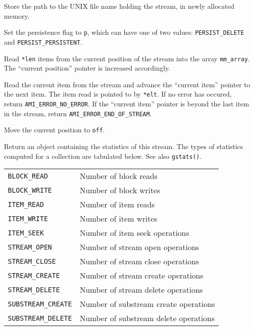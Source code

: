    {Store the path
  to the UNIX file name holding the stream, in newly allocated
  memory.}

   {Set the persistence flag
  to \lstinline|p|, which can have one of two values:
  \lstinline|PERSIST_DELETE| and \lstinline|PERSIST_PERSISTENT|.}
  
  {Read
  \lstinline|*len| items from the current position of the stream into
  the array \lstinline|mm_array|. The ``current position'' pointer is
  increased accordingly.  }  

  {Read the current item from the
  stream and advance the ``current item'' pointer to the next item.
  The item read is pointed to by \lstinline|*elt|. If no error has
  occured, return \lstinline|AMI_ERROR_NO_ERROR|. If the ``current
  item'' pointer is beyond the last item in the stream, return
  \lstinline|AMI_ERROR_END_OF_STREAM|.}  
    
  {Move the current position to \lstinline|off|.}
    

    {Return an object containing the statistics of this
      stream. The types of
        statistics computed for a collection are tabulated
        below. See also \lstinline|gstats()|.\\[1mm]
      \begin{tabular}{|l|l|} \hline \lstinline|BLOCK_READ| & Number of
        block reads\\ \lstinline|BLOCK_WRITE| & Number of block
        writes \\ \lstinline|ITEM_READ| & Number of item reads\\
        \lstinline|ITEM_WRITE| & Number of item writes\\ 
        \lstinline|ITEM_SEEK| & Number of item seek operations\\ 
        \lstinline|STREAM_OPEN| & Number of stream open operations\\ 
        \lstinline|STREAM_CLOSE| & Number of stream close operations
        \\ \lstinline|STREAM_CREATE| & Number of stream create
        operations\\ \lstinline|STREAM_DELETE| & Number of stream
        delete operations \\ \lstinline|SUBSTREAM_CREATE| & Number of
        substream create operations\\ \lstinline|SUBSTREAM_DELETE| &
        Number of substream delete operations \\ \hline \end{tabular}
    }

